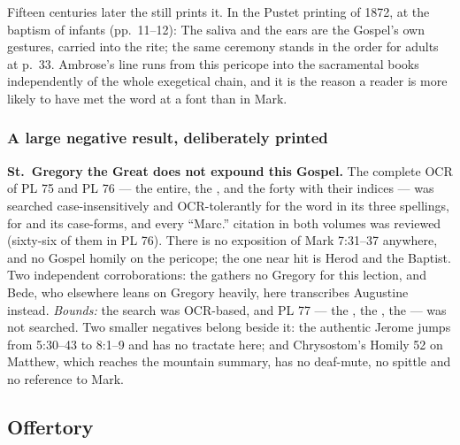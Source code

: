 Fifteen centuries later the  still prints it. In the
Pustet printing of 1872, at the baptism of infants (pp.~11--12):  The saliva and
the ears are the Gospel's own gestures, carried into the rite; the same
ceremony stands in the order for adults at p.~33. Ambrose's line runs from this
pericope into the sacramental books independently of the whole exegetical
chain, and it is the reason a reader is more likely to have met the word
 at a font than in Mark.

\subsubsection*{A large negative result, deliberately printed}

\textbf{St.~Gregory the Great does not expound this Gospel.} The complete OCR
of PL 75 and PL 76 --- the  entire, the , and the forty  with their indices ---
was searched case-insensitively and OCR-tolerantly for the word in its three
spellings, for  and its case-forms, and every ``Marc.''
citation in both volumes was reviewed (sixty-six of them in PL 76). There is no
exposition of Mark 7:31--37 anywhere, and no Gospel homily on the pericope; the
one near hit is Herod and the Baptist. Two independent corroborations: the
 gathers no Gregory for this lection, and Bede, who
elsewhere leans on Gregory heavily, here transcribes Augustine instead.
\textit{Bounds:} the search was OCR-based, and PL 77 --- the , the , the  --- was not searched.
Two smaller negatives belong beside it: the authentic Jerome  jumps from 5:30--43 to 8:1--9 and has no tractate here; and
Chrysostom's Homily 52 on Matthew, which reaches the mountain summary, has no
deaf-mute, no spittle and no reference to Mark.

\elementguard
\subsection*{Offertory }


